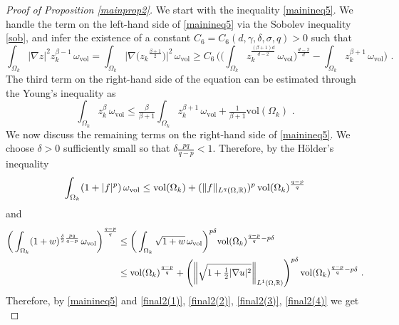 \documentclass[10pt, a4paper, reqno, oneside]{amsart}
\theoremstyle{plain}
\theoremstyle{definition}
\theoremstyle{plain}
\theoremstyle{definition}
\theoremstyle{plain}
\renewcommand{\=}{:=}
\begin{document}
\begin{proof}[Proof of Proposition \ref{mainprop2}]

We start with the inequality \eqref{mainineq5}. We handle the term on the left-hand side of \eqref{mainineq5} via the Sobolev inequality \eqref{sob}, and infer the existence of a constant $C_6=C_6(d,\gamma,\delta,\sigma,q)>0$ such that
\begin{equation} \label{final2(1)}
\int_{\Omega_k} |\nabla z|^2z_k^{\beta-1} \, \omega_{\mathrm{vol}} =
\int_{\Omega_k} \big|\nabla \big(z_k{}^{\frac{\beta+1}{2}}\big) \big|^2 \, \omega_{\mathrm{vol}} \geq
C_6\, \bigg(\bigg(\int_{\Omega_k} z_k^{\frac{(\beta+1)d}{d-2}}\, \omega_{\mathrm{vol}}\bigg)^{\frac{d-2}d} -\int_{\Omega_k} z_k^{\beta+1}\, \omega_{\mathrm{vol}}\bigg) \,\, .
\end{equation}
The third term on the right-hand side of the equation can be estimated through the Young's inequality as
\begin{equation} \label{final2(2)}
\int_{\Omega_k} z_k^{\beta}\, \omega_{\mathrm{vol}} \leq \tfrac{\beta}{\beta+1}\int_{\Omega_k}z_k^{\beta+1}\, \omega_{\mathrm{vol}} +\tfrac1{\beta+1}\mathrm{vol}(\Omega_k) \,\, .
\end{equation}
We now discuss the remaining terms on the right-hand side of \eqref{mainineq5}. We choose $\delta>0$ sufficiently small so that $\delta \frac{p q}{q-p}<1$. Therefore, by the H\"older's inequality
\begin{equation} \label{final2(3)}
\int_{\Omega_k} (1+|f|^p) \, \omega_{\mathrm{vol}} \leq
{\rm vol}(\Omega_k)+ (\|f\|_{L^q(\Omega,\mathbb{R})})^p \, {\rm vol}(\Omega_k)^{\frac{q-p}{q}}
\end{equation}
and
\begin{equation} \label{final2(4)} \begin{aligned}
\bigg(\int_{\Omega_k} (1+w)^{\frac{\delta}2\frac{pq}{q-p}} \, \omega_{\mathrm{vol}}\bigg)^{\frac{q-p}{q}}
&\leq \bigg(\int_{\Omega_k} \sqrt{1+w} \, \omega_{\mathrm{vol}}\bigg)^{p\delta} {\rm vol}(\Omega_k)^{\frac{q-p}{q} -p\delta} \\
&\leq {\rm vol}(\Omega_k)^{\frac{q-p}{q}} +\left(\left\|\sqrt{1+\tfrac12|\nabla u|^2}\right\|_{L^1(\Omega,\mathbb{R})}\right)^{p\delta}{\rm vol}(\Omega_k)^{\frac{q-p}{q} -p\delta} \,\, .
\end{aligned} \end{equation}
Therefore, by \eqref{mainineq5} and \eqref{final2(1)}, \eqref{final2(2)}, \eqref{final2(3)}, \eqref{final2(4)} we get
\begin{equation} \label{mainineq6}

\end{equation}
\end{proof}
\end{document}
